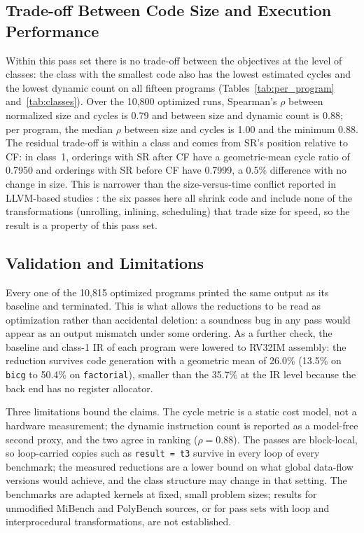 \documentclass[conference]{IEEEtran}
\begin{document}
\subsection{Trade-off Between Code Size and Execution Performance}
\label{sec:tradeoff}
Within this pass set there is no trade-off between the objectives at the level of classes: the class with the smallest code also has the lowest estimated cycles and the lowest dynamic count on all fifteen programs (Tables~\ref{tab:per_program} and~\ref{tab:classes}). Over the 10,800 optimized runs, Spearman's $\rho$ between normalized size and cycles is 0.79 and between size and dynamic count is 0.88; per program, the median $\rho$ between size and cycles is 1.00 and the minimum 0.88. The residual trade-off is within a class and comes from SR's position relative to CF: in class~1, orderings with SR after CF have a geometric-mean cycle ratio of 0.7950 and orderings with SR before CF have 0.7999, a 0.5\% difference with no change in size. This is narrower than the size-versus-time conflict reported in LLVM-based studies \cite{ref8}: the six passes here all shrink code and include none of the transformations (unrolling, inlining, scheduling) that trade size for speed, so the result is a property of this pass set.

\subsection{Validation and Limitations}
\label{sec:validation}
Every one of the 10,815 optimized programs printed the same output as its baseline and terminated. This is what allows the reductions to be read as optimization rather than accidental deletion: a soundness bug in any pass would appear as an output mismatch under some ordering. As a further check, the baseline and class-1 IR of each program were lowered to RV32IM assembly: the reduction survives code generation with a geometric mean of 26.0\% (13.5\% on \texttt{bicg} to 50.4\% on \texttt{factorial}), smaller than the 35.7\% at the IR level because the back end has no register allocator.

Three limitations bound the claims. The cycle metric is a static cost model, not a hardware measurement; the dynamic instruction count is reported as a model-free second proxy, and the two agree in ranking ($\rho = 0.88$). The passes are block-local, so loop-carried copies such as \texttt{result = t3} survive in every loop of every benchmark; the measured reductions are a lower bound on what global data-flow versions would achieve, and the class structure may change in that setting. The benchmarks are adapted kernels at fixed, small problem sizes; results for unmodified MiBench and PolyBench sources, or for pass sets with loop and interprocedural transformations, are not established.
\end{document}

